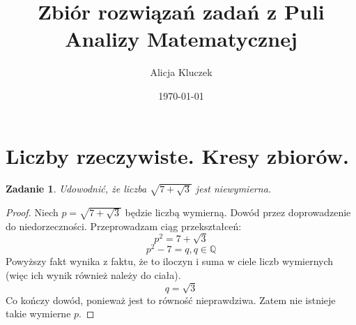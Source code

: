 \documentclass{article}
\newtheorem{problem}{Zadanie}
\begin{document}
\title{Zbiór rozwiązań zadań z Puli Analizy Matematycznej}
\author{Alicja Kluczek}

\date{\today}
\maketitle
\newpage

\section{Liczby rzeczywiste. Kresy zbiorów.}

\begin{problem}
    Udowodnić, że liczba $\sqrt{7 + \sqrt{3}}$ jest
    niewymierna.
\end{problem}
\begin{proof}
    Niech $p = \sqrt{7 + \sqrt{3}}$ będzie
    liczbą wymierną. Dowód przez doprowadzenie do
    niedorzeczności.
    Przeprowadzam ciąg przekształceń:
    $$ p^2 = 7 + \sqrt{3} $$
    $$ p^2 - 7 = q, q \in \mathbb{Q} $$
    Powyższy fakt wynika z faktu, że to iloczyn i suma
    w ciele liczb wymiernych (więc ich wynik również należy do ciała).
    $$ q = \sqrt{3} $$
    Co kończy dowód, ponieważ jest to równość nieprawdziwa.
    Zatem nie istnieje takie wymierne $p$.
\end{proof}
\end{document}
